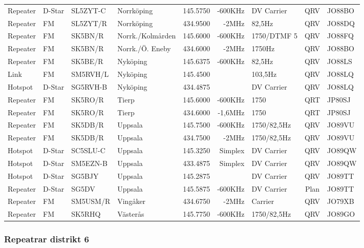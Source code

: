 \begin{longtable}{llllrrlcl}
Repeater & D-Star & SL5ZYT-C & Norrköping        & 145.5750 & -600KHz & DV Carrier    & QRV  & JO88BO \\
Repeater & FM     & SL5ZYT/R & Norrköping        & 434.9500 & -2MHz   & 82,5Hz        & QRV  & JO88DQ \\
Repeater & FM     & SK5BN/R  & Norrk./Kolmården  & 145.6000 & -600KHz & 1750/DTMF 5   & QRV  & JO88FQ \\
Repeater & FM     & SK5BN/R  & Norrk./Ö. Eneby   & 434.6000 & -2MHz   & 1750Hz        & QRV  & JO88BO \\
Repeater & FM     & SK5BE/R  & Nyköping          & 145.6375 & -600KHz & 82,5Hz        & QRV  & JO88LS \\
Link     & FM     & SM5RVH/L & Nyköping          & 145.4500 &         & 103,5Hz       & QRV  & JO88LQ \\
Hotspot  & D-Star & SG5RVH-B & Nyköping          & 434.4875 &         & DV Carrier    & QRV  & JO88LQ \\
Repeater & FM     & SK5RO/R  & Tierp             & 145.6000 & -600KHz & 1750          & QRT  & JP80SJ \\
Repeater & FM     & SK5RO/R  & Tierp             & 434.6000 & -1,6MHz & 1750          & QRT  & JP80SJ \\
Repeater & FM     & SK5DB/R  & Uppsala           & 145.7500 & -600KHz & 1750/82,5Hz   & QRV  & JO89VU \\
Repeater & FM     & SK5DB/R  & Uppsala           & 434.7500 & -2MHz   & 1750/82,5Hz   & QRV  & JO89VU \\
Hotspot  & D-Star & SC5SLU-C & Uppsala           & 145.3250 & Simplex & DV Carrier    & QRV  & JO89QW \\
Hotspot  & D-Star & SM5EZN-B & Uppsala           & 433.4875 & Simplex & DV Carrier    & QRV  & JO89QW \\
Hotspot  & D-Star & SG5BJY   & Uppsala           & 145.2875 &         & DV Carrier    & QRV  & JO89TT \\
Repeater & D-Star & SG5DV    & Uppsala           & 145.5875 & -600KHz & DV Carrier    & Plan & JO89TT \\
Repeater & FM     & SM5USM/R & Vingåker          & 434.6750 & -2MHz   & Carrier       & QRV  & JO79XB \\
Repeater & FM     & SK5RHQ   & Västerås          & 145.7750 & -600KHz & 1750/82,5Hz   & QRV  & JO89GO

\end{longtable}

\subsubsection{Repeatrar distrikt 6}

